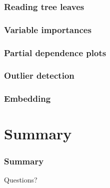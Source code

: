 \documentclass{beamer}
\begin{document}
\begin{frame}
  \frametitle{Reading tree leaves}
\end{frame}

\begin{frame}
  \frametitle{Variable importances}
\end{frame}

\begin{frame}
  \frametitle{Partial dependence plots}
\end{frame}

\begin{frame}
  \frametitle{Outlier detection}
\end{frame}

\begin{frame}
  \frametitle{Embedding}
\end{frame}






\section{Summary}

\begin{frame}
  \frametitle{Summary}
\end{frame}

\begin{frame}
\begin{center}
{\Huge  Questions?}
\end{center}
\end{frame}
\end{document}
